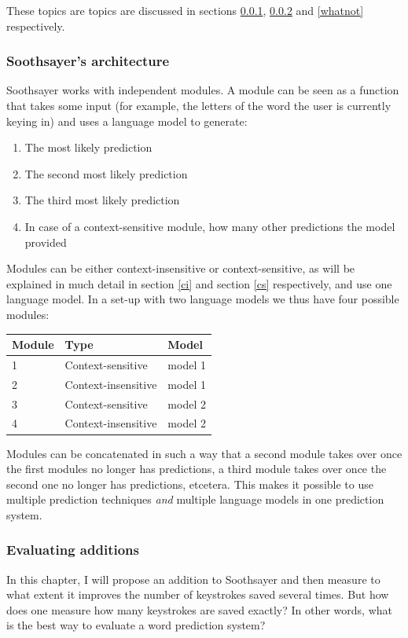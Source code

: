 \documentclass[12pt]{article}
\let\originaltable\table
\let\endoriginaltable\endtable
\renewenvironment{table}[1][ht]{%
  \originaltable[#1]
  \centering}%
  {\endoriginaltable}
\begin{document}
These topics are topics are discussed in sections \ref{ss_intro}, \ref{evaluation} and \ref{whatnot} respectively.

\subsubsection{Soothsayer's architecture} \label{ss_intro}
Soothsayer works with independent modules. A module can be seen as a function that takes some input (for example, the letters of the word the user is currently keying in) and uses a language model to generate:

\begin{enumerate}
\item The most likely prediction
\item The second most likely prediction
\item The third most likely prediction
\item In case of a context-sensitive module, how many other predictions the model provided
\end{enumerate}

Modules can be either context-insensitive or context-sensitive, as will be explained in much detail in section \ref{ci} and section \ref{cs} respectively, and use one language model. In a set-up with two language models we thus have four possible modules:

\begin{table}[h]
\begin{tabular}{lll} 
Module&Type&Model\\
\hline
1&Context-sensitive&model 1\\
2&Context-insensitive&model 1\\
3&Context-sensitive&model 2\\
4&Context-insensitive&model 2\\
\end{tabular} 
\caption{A possible module set-up for Soothsayer}
\end{table}

Modules can be concatenated in such a way that a second module takes over once the first modules no longer has predictions, a third module takes over once the second one no longer has predictions, etcetera. This makes it possible to use multiple prediction techniques \emph{and} multiple language models in one prediction system.

\subsubsection{Evaluating additions} \label{evaluation}
In this chapter, I will propose an addition to Soothsayer and then measure to what extent it improves the number of keystrokes saved several times. But how does one measure how many keystrokes are saved exactly? In other words, what is the best way to evaluate a word prediction system?
\end{document}
